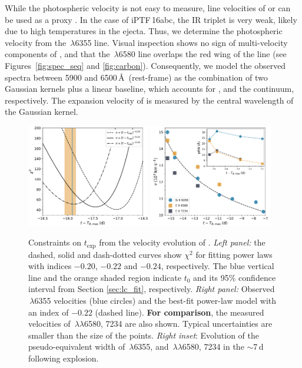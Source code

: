 \documentclass[twocolumn]{aastex61}
\newcommand{\abc}{iPTF\,16abc}
\begin{document}
While the photospheric velocity is not easy to measure, line velocities of
 or  can be used as a proxy
\citep{2014ApJ...784...85P,2016ApJ...826..144S}. In the case of \abc, the
 IR triplet is very weak, likely due to high temperatures in the
ejecta. Thus, we determine the photospheric velocity from the
\,$\lambda$6355 line. Visual inspection shows no sign of
multi-velocity components of , and that the
\,$\lambda$6580 line overlaps the red wing of the  line
(see Figures~\ref{fig:spec_seq} and \ref{fig:carbon}). Consequently, we model
the observed spectra between 5900 and 6500\,\AA\ (rest-frame) as the
combination of two Gaussian kernels plus a linear baseline, which accounts for
,  and the continuum, respectively. The expansion
velocity of  is measured by the central wavelength of the
 Gaussian kernel.

\begin{figure}[!thb]
  \centering
  \includegraphics[width=0.48\textwidth]{Chi2.pdf}
  \includegraphics[width=0.48\textwidth]{VelocityPlot.pdf}
  \caption{
  Constraints on $t_\mathrm{exp}$ from the velocity evolution of .
  \textit{Left panel:} the dashed, solid and dash-dotted curves show $\chi^2$
  for fitting power laws with indices $-0.20$, $-0.22$ and $-0.24$,
  respectively. The blue vertical line and the orange shaded region indicate
  $t_0$ and its 95\% confidence interval from Section \ref{sec:lc_fit},
  respectively. \textit{Right panel:} Observed \,$\lambda$6355
  velocities (blue circles) and the best-fit power-law model with an index of
  $-0.22$ (dashed line). \textbf{For comparison}, the measured velocities of
  \,$\lambda\lambda$6580, 7234 are also shown. Typical uncertainties
  are smaller than the size of the points. \textit{Right inset}: Evolution of
  the pseudo-equivalent width of \,$\lambda$6355, and
  \,$\lambda\lambda$6580, 7234 in the $\sim$7\,d following 
  explosion.}
  \label{fig:velocity_t_exp}
\end{figure}
\end{document}
